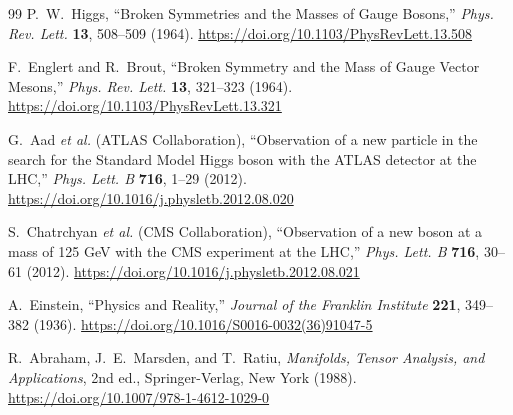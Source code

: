 \documentclass[%
 reprint,
 amsmath,amssymb,
 aps,
]{revtex4-1}
\numberwithin{equation}{section}%
\begin{document}
\begin{thebibliography}{99}
P.~W.~Higgs, 
``Broken Symmetries and the Masses of Gauge Bosons,'' 
\textit{Phys. Rev. Lett.} \textbf{13}, 508--509 (1964).
\href{https://doi.org/10.1103/PhysRevLett.13.508}{https://doi.org/10.1103/PhysRevLett.13.508}

F.~Englert and R.~Brout, 
``Broken Symmetry and the Mass of Gauge Vector Mesons,'' 
\textit{Phys. Rev. Lett.} \textbf{13}, 321--323 (1964).
\href{https://doi.org/10.1103/PhysRevLett.13.321}{https://doi.org/10.1103/PhysRevLett.13.321}

G.~Aad \textit{et al.} (ATLAS Collaboration), 
``Observation of a new particle in the search for the Standard Model Higgs boson with the ATLAS detector at the LHC,'' 
\textit{Phys. Lett. B} \textbf{716}, 1--29 (2012).
\href{https://doi.org/10.1016/j.physletb.2012.08.020}{https://doi.org/10.1016/j.physletb.2012.08.020}

S.~Chatrchyan \textit{et al.} (CMS Collaboration), 
``Observation of a new boson at a mass of 125 GeV with the CMS experiment at the LHC,'' 
\textit{Phys. Lett. B} \textbf{716}, 30--61 (2012).
\href{https://doi.org/10.1016/j.physletb.2012.08.021}{https://doi.org/10.1016/j.physletb.2012.08.021}

A.~Einstein, 
``Physics and Reality,'' 
\textit{Journal of the Franklin Institute} \textbf{221}, 349--382 (1936).
\href{https://doi.org/10.1016/S0016-0032(36)91047-5}{https://doi.org/10.1016/S0016-0032(36)91047-5}

R.~Abraham, J.~E.~Marsden, and T.~Ratiu, 
\textit{Manifolds, Tensor Analysis, and Applications}, 
2nd ed., Springer-Verlag, New York (1988).
\href{https://doi.org/10.1007/978-1-4612-1029-0}{https://doi.org/10.1007/978-1-4612-1029-0}


\end{thebibliography}
\end{document}
